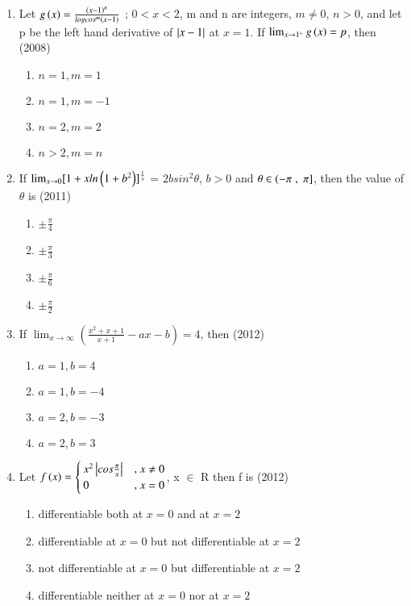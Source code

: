 \documentclass[journal]{IEEEtran}
\numberwithin{equation}{enumi}
\numberwithin{figure}{enumi}
\begin{document}
\begin{enumerate}
	\item Let $g\left(x\right)= \frac{\left(x-1\right)^n}{logcos^m\left(x-1\right)}$ ; $0<x<2$, m and n are integers, $m\neq0$, $n>0$, and let p be the left hand derivative of $\left\vert x-1\right\vert$ at $x=1$. If $\lim_{x \to 1^+}
		{g\left(x\right)=p}$, then \hfill{(2008)}
		\begin{enumerate}
			\item $n=1,m=1$
			\item $n=1,m=-1$
			\item $n=2,m=2$
			\item $n>2,m=n$ \\
		\end{enumerate}
	\item If $\lim_{x \to 0}[1+xln\left(1+b^2\right)]^\frac{1}{x}$ = $2bsin^2\theta$, $b>0$ and $\theta \in \left(-\pi\right.,{}\left.\pi\right]$, then the value of $\theta$ is \hfill{(2011)}
		\begin{enumerate}
			\item $\pm\frac{\pi}{4}$
			\item $\pm\frac{\pi}{3}$
			\item $\pm\frac{\pi}{6}$
			\item $\pm\frac{\pi}{2}$ \\
		\end{enumerate}
	\item If $\lim_{ x \to \infty}(\frac{x^2+x+1}{x+1}-ax-b) = 4$, then \hfill{(2012)}
		\begin{enumerate}
			\item $a=1,b=4$
			\item $a=1,b=-4$
			\item $a=2,b=-3$
			\item $a=2,b=3$ \\
		\end{enumerate}
	\item Let $f\left(x\right) =\begin{cases} x^2\left\vert cos \frac{\pi}{x}\right\vert & \text{, } x \neq 0 \\ 0 & \text{, } x = 0 \end{cases}$, x $\in$ R then f is \hfill{(2012)}
		\begin{enumerate}
			\item differentiable both at $x=0$ and at $x=2$
			\item differentiable at $x=0$ but not differentiable at $x=2$
			\item not differentiable at $x=0$ but differentiable at $x=2$
			\item differentiable neither at $x=0$ nor at $x=2$ \\

\end{enumerate}
\end{enumerate}
\end{document}
